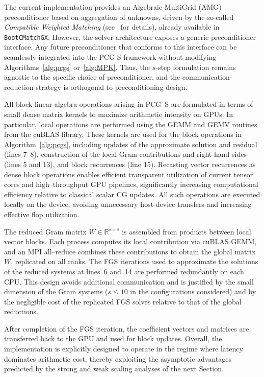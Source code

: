\documentclass[pdflatex,sn-mathphys-num]{sn-jnl}%
\begin{document}
The current implementation provides an Algebraic MultiGrid (AMG) preconditioner
based on aggregation of unknowns, driven by the so-called {\em Compatible Weighted Matching} (see~\cite{Dambra2018,ieee2023} for details), already available in
\texttt{Boot\-C\-MatchGX}. However, the solver architecture exposes a generic
preconditioner interface. Any future preconditioner that conforms to this
interface can be seamlessly integrated into the PCG-S framework without
modifying Algorithms~\ref{alg:pcgs} or~\ref{alg:MPK}.
Thus, the $s$-step formulation remains agnostic to the specific choice of
preconditioner, and the communication-reduction strategy is orthogonal to
preconditioning design.

All block linear algebra operations arising in PCG--S are formulated in terms of small dense matrix kernels to maximize arithmetic intensity on GPUs.
In particular, local operations are performed using the GEMM and GEMV routines from the cuBLAS library. These kernels are used for the block operations in Algorithm~\ref{alg:pcgs}, including updates of the approximate solution and residual (lines 7--8), construction of the local Gram contributions and
right-hand sides (lines 5 and 13), and block recurrences (line 15).
Recasting vector recurrences as dense block operations enables efficient transparent
utilization of current tensor cores and high--throughput GPU pipelines, significantly
increasing computational efficiency relative to classical scalar CG updates.
All such operations are executed locally on the device, avoiding unnecessary
host-device transfers and increasing effective flop utilization.

The reduced Gram matrix $W \in \mathbb{R}^{s \times s}$ is assembled from products between local vector blocks.
Each process computes its local contribution via cuBLAS GEMM, and an MPI all--reduce combines these contributions to obtain the global matrix $W$, replicated on all ranks.
The FGS iterations used to approximate the solutions of the reduced
systems at lines~6 and~14 are performed redundantly on each CPU.
This design avoids additional communication and is justified by the
small dimension of the Gram systems ($s\leq 10$ in the configurations
considered) and by the negligible cost of the replicated FGS solves
relative to that of the global reductions.

After completion of the FGS iteration, the coefficient vectors and matrices
are transferred back to the GPU and used for block updates.
Overall, the implementation is explicitly designed to operate in the regime
where latency dominates arithmetic cost, thereby exploiting the asymptotic
advantages predicted by the strong and weak scaling analyses of the next Section.
\end{document}
